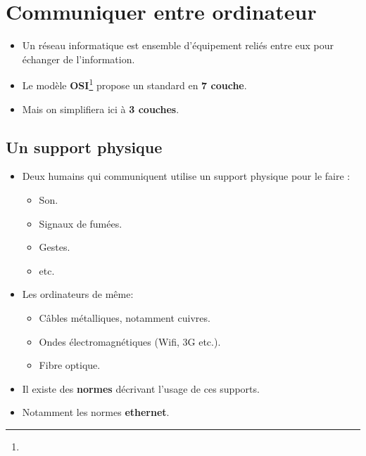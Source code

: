 \section[Communiquer]{Communiquer entre ordinateur} %
\begin{frame}
	\begin{itemize}
		\item Un réseau informatique est ensemble d'équipement reliés entre eux pour échanger de l'information.
		\item Le modèle \textbf{OSI}\footnote{} propose un standard en \textbf{7 couche}.
		\item Mais on simplifiera ici à \textbf{3 couches}.
		
	\end{itemize}
\end{frame}
\subsection{Un support physique}

\begin{frame}
	\begin{itemize}
		\item Deux humains qui communiquent utilise un support physique pour le faire : 			\begin{itemize}
				\item Son. 
				\item Signaux de fumées.
				\item Gestes.
				\item etc.
			\end{itemize}
		\item Les ordinateurs de même:
			\begin{itemize}
				\item Câbles métalliques, notamment cuivres.
				\item Ondes électromagnétiques (Wifi, 3G etc.).
				\item Fibre optique. %
			\end{itemize} 
		\item Il existe des \textbf{normes} décrivant l'usage de ces supports.
		\item Notamment les normes \textbf{ethernet}.
	\end{itemize}
\end{frame}
